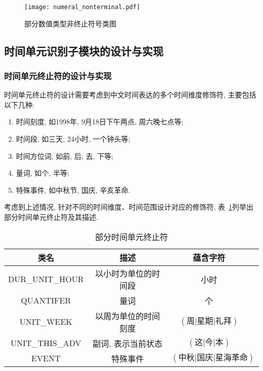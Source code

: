\begin{figure}[h]
    \centering
    \texttt{[image: numeral\_nonterminal.pdf]}
    \caption{部分数值类型非终止符号类图}
    \label{fig:numeral_nonterminal}
\end{figure}

\subsection{时间单元识别子模块的设计与实现}

\subsubsection{时间单元终止符的设计与实现}


时间单元终止符的设计需要考虑到中文时间表达的多个时间维度修饰符, 主要包括以下几种:
\begin{enumerate}
    \item 时间刻度, 如1998年, 9月18日下午两点, 周六晚七点等;
    \item 时间段, 如三天, 24小时, 一个钟头等;
    \item 时间方位词, 如前, 后, 去, 下等;
    \item 量词, 如个, 半等;
    \item 特殊事件, 如中秋节, 国庆, 辛亥革命.
\end{enumerate}

考虑到上述情况, 针对不同的时间维度、时间范围设计对应的修饰符, 表~\ref{tab:date_terminal}列举出部分时间单元终止符及其描述.


\begin{table}[h]
    \centering
    \caption{部分时间单元终止符}
    \begin{tabular}{*{4}{c}}
        \toprule
        类名            & 描述                 & 蕴含字符                                 \\
        \midrule
        DUR\_UNIT\_HOUR & 以小时为单位的时间段 & 小时                                     \\
        QUANTIFER       & 量词                 & 个                                       \\
        UNIT\_WEEK      & 以周为单位的时间刻度 & $\left(\text{周|星期|礼拜}\right)$       \\
        UNIT\_THIS\_ADV & 副词, 表示当前状态   & $\left(\text{这|今|本}\right)$           \\
        EVENT           & 特殊事件             & $\left(\text{中秋|国庆|星海革命}\right)$ \\
        \bottomrule
    \end{tabular}
    \label{tab:date_terminal}
\end{table}


